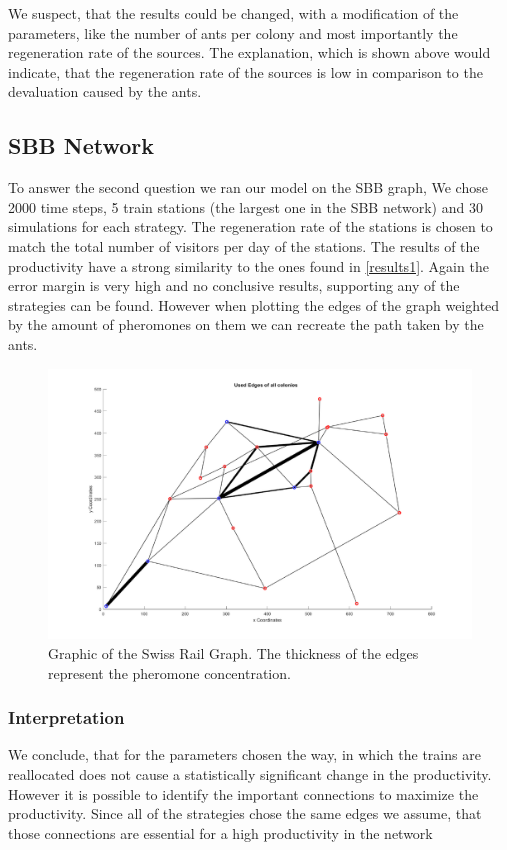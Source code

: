 We suspect, that the results could be changed, with a modification of the parameters, like the number of ants per colony and most importantly the regeneration rate of the sources. The explanation, which is shown above would indicate, that the regeneration rate of the sources is low in comparison to the devaluation caused by the ants.

\subsection{SBB Network}
To answer the second question we ran our model on the SBB graph, We chose 2000 time steps, 5 train stations (the largest one in the SBB network) and 30 simulations for each strategy. The regeneration rate of the stations is chosen to match the total number of visitors per day of the stations. The results of the productivity have a strong similarity to the ones found in \ref{results1}. Again the error margin is very high and no conclusive results, supporting any of the strategies can be found. However when plotting the edges of the graph weighted by the amount of pheromones on them we can recreate the path taken by the ants.
\begin{figure}[H]
	\centering
	\includegraphics[scale=0.8]{sbbWeighted.pdf}
	\caption{Graphic of the Swiss Rail Graph. The thickness of the edges represent the pheromone concentration.}
\end{figure}

\subsubsection{Interpretation}
We conclude, that for the parameters chosen the way, in which the trains are reallocated does not cause a statistically significant change in the productivity. However it is possible to identify the important connections to maximize the productivity. Since all of the strategies chose the same edges we assume, that those connections are essential for a high productivity in the network